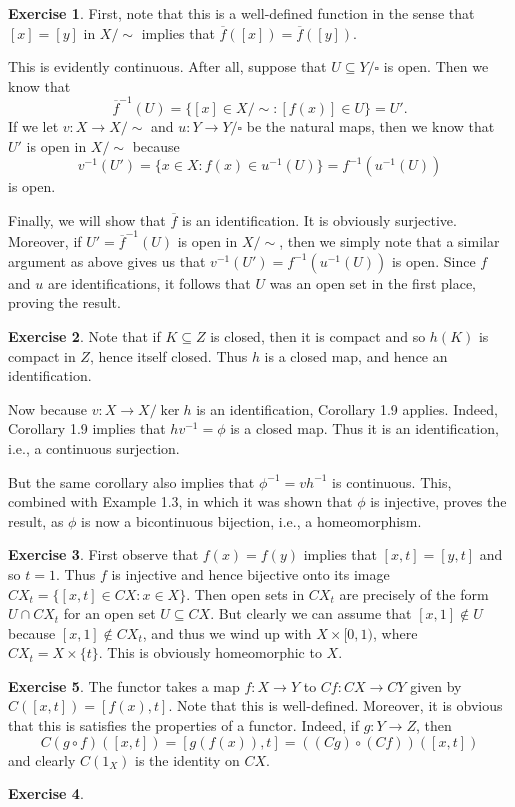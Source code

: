 \documentclass{article}
\theoremstyle{definition}
\newtheorem{intex}{Exercise}[section]
\newenvironment{exercise}{\begin{intex}\label{\theintex}}{\end{intex}}
\newcommand{\ecls}{%
  {\sim}%
}
\begin{document}
\begin{exercise} \leavevmode
First, note that this is a well-defined function in the sense that $[x]=[y]$ in $X/\ecls$ implies that $\overline f([x])=\overline f([y])$. 

This is evidently continuous. After all, suppose that $U\subseteq Y/\square$ is open. Then we know that \[\overline f^{-1}(U)=\{[x]\in X/\ecls:[f(x)]\in U\}=U'.\] If we let $v:X\to X/\ecls$ and $u:Y\to Y/\square$ be the natural maps, then we know that $U'$ is open in $X/\ecls$ because \[v^{-1}(U')=\{x\in X:f(x)\in u^{-1}(U)\}=f^{-1}(u^{-1}(U))\] is open. 

Finally, we will show that $\overline f$ is an identification. It is obviously surjective. Moreover, if $U'=\overline f^{-1}(U)$ is open in $X/\ecls$, then we simply note that a similar argument as above gives us that $v^{-1}(U')=f^{-1}(u^{-1}(U))$ is open. Since $f$ and $u$ are identifications, it follows that $U$ was an open set in the first place, proving the result. 
\end{exercise} 

\begin{exercise} \leavevmode
Note that if $K\subseteq Z$ is closed, then it is compact and so $h(K)$ is compact in $Z$, hence itself closed. Thus $h$ is a closed map, and hence an identification. 

Now because $v:X\to X/\ker h$ is an identification, Corollary 1.9 applies. Indeed, Corollary 1.9 implies that $hv^{-1}=\phi$ is a closed map. Thus it is an identification, i.e., a continuous surjection. 

But the same corollary also implies that $\phi^{-1}=vh^{-1}$ is continuous. This, combined with Example 1.3, in which it was shown that $\phi$ is injective, proves the result, as $\phi$ is now a bicontinuous bijection, i.e., a homeomorphism. 
\end{exercise} 

\begin{exercise} \leavevmode
First observe that $f(x)=f(y)$ implies that $[x,t]=[y,t]$ and so $t=1$. Thus $f$ is injective and hence bijective onto its image $CX_t=\{[x,t]\in CX:x\in X\}$. Then open sets in $CX_t$ are precisely of the form $U\cap CX_t$ for an open set $U\subseteq CX$. But clearly we can assume that $[x,1]\not\in U$ because $[x,1]\not\in CX_t$, and thus we wind up with $X\times[0,1)$, where $CX_t=X\times\{t\}$. This is obviously homeomorphic to $X$. 
\end{exercise} 

\begin{exercise} \leavevmode
The functor takes a map $f:X\to Y$ to $Cf:CX\to CY$ given by $C([x,t])=[f(x),t]$. Note that this is well-defined. Moreover, it is obvious that this is satisfies the properties of a functor. Indeed, if $g:Y\to Z$, then \[C(g\circ f)([x,t])=[g(f(x)),t]=((Cg)\circ(Cf))([x,t])\] and clearly $C(1_X)$ is the identity on $CX$. \begin{exercise} \leavevmode

\end{exercise} 
\end{exercise} 
\end{document}

